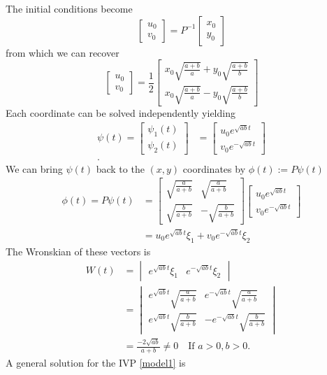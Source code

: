 \documentclass[12pt]{article}
\begin{document}
The initial conditions become 
\[
  \begin{bmatrix}u_0\\v_0\end{bmatrix} = P^{-1}\begin{bmatrix}x_0 \\ y_0 \end{bmatrix}
\]
from which we can recover
\begin{equation}\label{initial1}
  \begin{bmatrix}
    u_0\\v_0 
  \end{bmatrix} 
  =\frac{1}{2}\begin{bmatrix}
    x_0\sqrt{\frac{a+b}{a}} +y_0\sqrt{\frac{a+b}{b}}\\
    x_0\sqrt{\frac{a+b}{a}} -y_0\sqrt{\frac{a+b}{b}}
  \end{bmatrix}
\end{equation}
Each coordinate can be solved independently yielding
\begin{align*}
  \psi(t)=\begin{bmatrix}\psi_1(t)\\\psi_2(t)\end{bmatrix}&=\begin{bmatrix}u_0e^{\sqrt{ab}t}\\v_0e^{-\sqrt{ab}t}\end{bmatrix}\\.
\end{align*}
We can bring $\psi(t)$ back to the $(x,y)$ coordinates by $\phi(t):=P\psi(t)$
\begin{align}\label{general}
  \phi(t)=P\psi(t)&= \begin{bmatrix}
  \sqrt{\frac{a}{a+b}} & \sqrt{\frac{a}{a+b}}\\
\sqrt{\frac{b}{a+b}} & -\sqrt{\frac{b}{a+b}}\end{bmatrix}\begin{bmatrix}u_0e^{\sqrt{ab}t}\\v_0e^{-\sqrt{ab}t}\end{bmatrix}\\
		     &= u_0e^{\sqrt{ab}t}\xi_1+v_0e^{-\sqrt{ab}t}\xi_2
\end{align}
The Wronskian of these vectors is 
\begin{align*}
  W(t)&=\begin{vmatrix}e^{\sqrt{ab}t}\xi_1& e^{-\sqrt{ab}t}\xi_2\end{vmatrix} \\
      &= \begin{vmatrix}
	e^{\sqrt{ab}t}\sqrt{\frac{a}{a+b}} & e^{-\sqrt{ab}t}\sqrt{\frac{a}{a+b}}\\
	e^{\sqrt{ab}t}\sqrt{\frac{b}{a+b}} & -e^{-\sqrt{ab}t}\sqrt{\frac{b}{a+b}}
      \end{vmatrix}\\
      & = \frac{-2\sqrt{ab}}{a+b}\neq 0\quad\text{If }a>0,b>0.
\end{align*}A general solution for the IVP \ref{model1} is 
\end{document}
